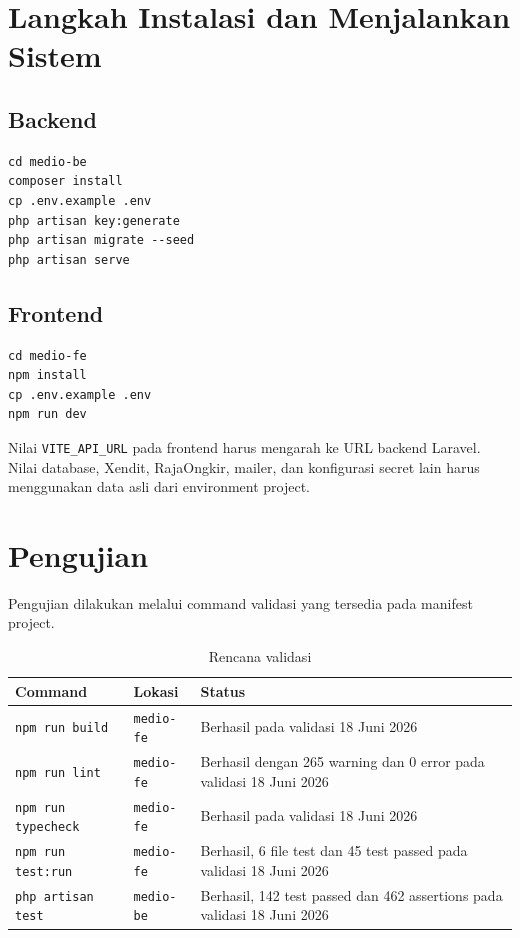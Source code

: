 \documentclass[12pt,a4paper]{report}
\begin{document}
\section{Langkah Instalasi dan Menjalankan Sistem}
\subsection{Backend}
\begin{verbatim}
cd medio-be
composer install
cp .env.example .env
php artisan key:generate
php artisan migrate --seed
php artisan serve
\end{verbatim}

\subsection{Frontend}
\begin{verbatim}
cd medio-fe
npm install
cp .env.example .env
npm run dev
\end{verbatim}

Nilai \texttt{VITE\_API\_URL} pada frontend harus mengarah ke URL backend Laravel. Nilai database, Xendit, RajaOngkir, mailer, dan konfigurasi secret lain harus menggunakan data asli dari environment project.

\section{Pengujian}
Pengujian dilakukan melalui command validasi yang tersedia pada manifest project.

\begin{table}[H]
\centering
\caption{Rencana validasi}
\begin{tabular}{p{}p{}p{}}
\toprule
Command & Lokasi & Status \\
\midrule
\texttt{npm run build} & \texttt{medio-fe} & Berhasil pada validasi 18 Juni 2026 \\
\texttt{npm run lint} & \texttt{medio-fe} & Berhasil dengan 265 warning dan 0 error pada validasi 18 Juni 2026 \\
\texttt{npm run typecheck} & \texttt{medio-fe} & Berhasil pada validasi 18 Juni 2026 \\
\texttt{npm run test:run} & \texttt{medio-fe} & Berhasil, 6 file test dan 45 test passed pada validasi 18 Juni 2026 \\
\texttt{php artisan test} & \texttt{medio-be} & Berhasil, 142 test passed dan 462 assertions pada validasi 18 Juni 2026 \\
\bottomrule
\end{tabular}
\end{table}
\end{document}
